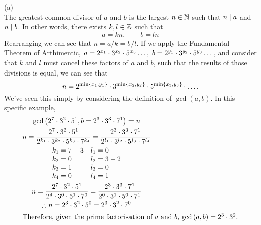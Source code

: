 \documentclass[a4paper, 11pt]{report}
\begin{document}
\newpage
{}
\sol (a) \\
The greatest common divisor of $a$ and $b$ is the largest $n\in\mathbb{N}$ such that $n\mathrel{\mid} a$ and $n\mathrel{\mid} b$. In other words, there exists $k,l\in\mathbb{Z}$ such that
$$
  a = kn,\qquad b = ln
$$
Rearranging we can see that $n = a/k = b/l$. If we apply the Fundamental Theorem of Arthimentic, $a = 2^{x_1}\cdot3^{x_2}\cdot5^{x_3}\dots,\ b = 2^{y_1}\cdot3^{y_2}\cdot5^{y_3}\dots$, and consider that $k$ and $l$ must cancel these factors of $a$ and $b$, such that the results of those divisions is equal, we can see that 
$$
  n = 2^{\min\left\lbrace x_1,y_1 \right\rbrace}\cdot3^{\min\left\lbrace x_2,y_2 \right\rbrace}\cdot5^{\min\left\lbrace x_3,y_3 \right\rbrace}\cdot\dots.
$$
We've seen this simply by considering the definition of $\gcd(a,b)$. In this specific example,
\begin{gather*}
  \gcd\left( 2^7\cdot3^2\cdot5^1, b = 2^3\cdot3^3\cdot7^1 \right) = n \\
  n = \frac{2^7\cdot3^2\cdot5^1}{2^{k_1}\cdot3^{k_2}\cdot5^{k_3}\cdot7^{k_4}} = \frac{2^3\cdot3^3\cdot7^1}{2^{l_1}\cdot3^{l_2}\cdot5^{l_3}\cdot7^{l_4}} \\
  \begin{array}{ll}
    k_1 = 7 - 3 & l_1 = 0 \\
    k_2 = 0     & l_2 = 3 - 2 \\
    k_3 = 1     & l_3 = 0 \\
    k_4 = 0     & l_4 = 1 \\
  \end{array} \\
  n = \frac{2^7\cdot3^2\cdot5^1}{2^{4}\cdot3^{0}\cdot5^{1}\cdot7^{0}} = \frac{2^3\cdot3^3\cdot7^1}{2^{0}\cdot3^{1}\cdot5^{0}\cdot7^{1}} \\
  \therefore n = 2^3\cdot3^2\cdot5^0 = 2^3\cdot3^2\cdot7^0 \\
  \intertext{Therefore, given the prime factorisation of $a$ and $b$, $\gcd\left( a,b \right)=2^3\cdot3^2$.}
\end{gather*}
\end{document}
